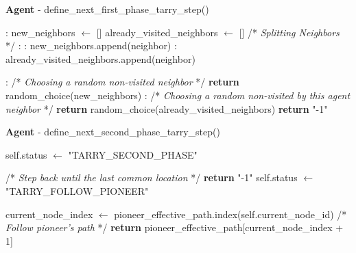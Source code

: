 \begin{algorithm}
\caption{\textbf{Agent} - define\_next\_first\_phase\_tarry\_step()}
\label{alg:define_agent_next_first_phase_step}
\begin{algorithmic}
    :
    \State new\_neighbors $\gets$ [] 
    \State already\_visited\_neighbors $\gets$ []
    \State /* \textit{Splitting Neighbors } */
    :
        :
            \State new\_neighbors.append(neighbor)
        :
            \State already\_visited\_neighbors.append(neighbor)
        \EndIf
    \EndFor


    :
        \State /* \textit{Choosing a random non-visited neighbor } */
        \State \textbf{return} random\_choice(new\_neighbors)
    :
        \State /* \textit{Choosing a random non-visited by this agent neighbor } */
        \State \textbf{return} random\_choice(already\_visited\_neighbors)
    \EndIf
    \State \textbf{return} "-1" 
    \EndProcedure
\end{algorithmic}
\end{algorithm}


\begin{algorithm}
\caption{\textbf{Agent} - define\_next\_second\_phase\_tarry\_step()}
\label{alg:define_agent_next_second_phase_step}
\begin{algorithmic}
            \State self.status $\gets$ "TARRY\_SECOND\_PHASE"
        \EndIf
        
                \State /* \textit{Step back until the last common location } */
                \State \textbf{return} "-1"
            \Else
                \State self.status $\gets$ "TARRY\_FOLLOW\_PIONEER"
            \EndIf
        \EndIf

        current\_node\_index $\gets$ pioneer\_effective\_path.index(self.current\_node\_id)
        \State /* \textit{Follow pioneer's path} */
        \State \textbf{return} pioneer\_effective\_path[current\_node\_index + 1]
    \EndProcedure
\end{algorithmic}
\end{algorithm}

